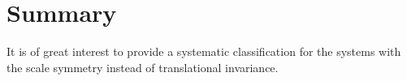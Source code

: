 \chapter{Summary}
\label{ch:summary}

It is of great interest to provide a systematic classification for the systems with the scale symmetry instead of translational invariance.